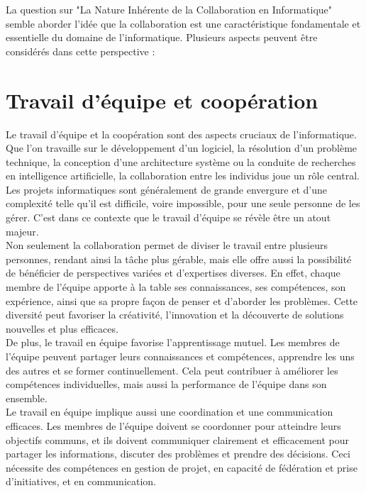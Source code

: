 La question sur "La Nature Inhérente de la Collaboration en Informatique" semble aborder l'idée que la collaboration est une caractéristique fondamentale et essentielle du domaine de l'informatique. Plusieurs aspects peuvent être considérés dans cette perspective :

\section{Travail d'équipe et coopération} 
Le travail d'équipe et la coopération sont des aspects cruciaux de l'informatique. Que l'on travaille sur le développement d'un logiciel, la résolution d'un problème technique, la conception d'une architecture système ou la conduite de recherches en intelligence artificielle, la collaboration entre les individus joue un rôle central. \\

Les projets informatiques sont généralement de grande envergure et d'une complexité telle qu'il est difficile, voire impossible, pour une seule personne de les gérer. C'est dans ce contexte que le travail d'équipe se révèle être un atout majeur. \\

Non seulement la collaboration permet de diviser le travail entre plusieurs personnes, rendant ainsi la tâche plus gérable, mais elle offre aussi la possibilité de bénéficier de perspectives variées et d'expertises diverses. En effet, chaque membre de l'équipe apporte à la table ses connaissances, ses compétences, son expérience, ainsi que sa propre façon de penser et d'aborder les problèmes. Cette diversité peut favoriser la créativité, l'innovation et la découverte de solutions nouvelles et plus efficaces.\\

De plus, le travail en équipe favorise l'apprentissage mutuel. Les membres de l'équipe peuvent partager leurs connaissances et compétences, apprendre les uns des autres et se former continuellement. Cela peut contribuer à améliorer les compétences individuelles, mais aussi la performance de l'équipe dans son ensemble.\\

Le travail en équipe implique aussi une coordination et une communication efficaces. Les membres de l'équipe doivent se coordonner pour atteindre leurs objectifs communs, et ils doivent communiquer clairement et efficacement pour partager les informations, discuter des problèmes et prendre des décisions. Ceci nécessite des compétences en gestion de projet, en capacité de fédération et prise d'initiatives, et en communication.\\

